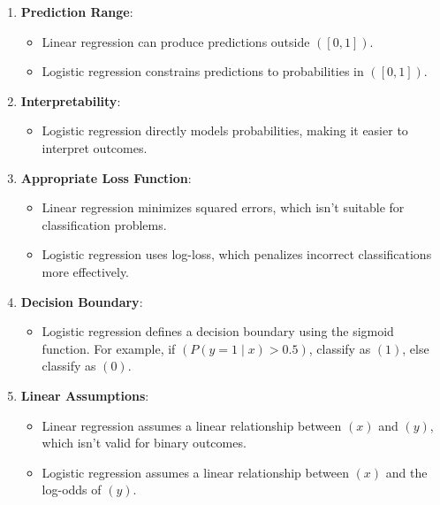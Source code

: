 \documentclass[12pt]{book}
\providecommand{\tightlist}{%
  \setlength{\itemsep}{0pt}\setlength{\parskip}{0pt}}
\begin{document}
\begin{enumerate}
\def\labelenumi{\arabic{enumi}.}
\tightlist
\item
  \textbf{Prediction Range}:

  \begin{itemize}
  \tightlist
  \item
    Linear regression can produce predictions outside \(([0, 1])\).
  \item
    Logistic regression constrains predictions to probabilities in
    \(([0, 1])\).
  \end{itemize}
\item
  \textbf{Interpretability}:

  \begin{itemize}
  \tightlist
  \item
    Logistic regression directly models probabilities, making it easier
    to interpret outcomes.
  \end{itemize}
\item
  \textbf{Appropriate Loss Function}:

  \begin{itemize}
  \tightlist
  \item
    Linear regression minimizes squared errors, which isn't suitable for
    classification problems.
  \item
    Logistic regression uses log-loss, which penalizes incorrect
    classifications more effectively.
  \end{itemize}
\item
  \textbf{Decision Boundary}:

  \begin{itemize}
  \tightlist
  \item
    Logistic regression defines a decision boundary using the sigmoid
    function. For example, if \(( P(y=1 \mid x) > 0.5 )\), classify as
    \(( 1 )\), else classify as \(( 0 )\).
  \end{itemize}
\item
  \textbf{Linear Assumptions}:

  \begin{itemize}
  \tightlist
  \item
    Linear regression assumes a linear relationship between \(( x )\)
    and \(( y )\), which isn't valid for binary outcomes.
  \item
    Logistic regression assumes a linear relationship between \(( x )\)
    and the log-odds of \(( y )\).
  \end{itemize}
\end{enumerate}
\end{document}

